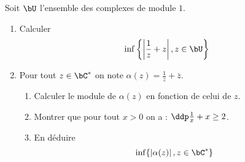 \documentclass[a4paper, 11pt,reqno]{article}
\begin{document}
\begin{exercice}
Soit $\bU$ l'ensemble des complexes de module $1$. 
\begin{enumerate}
\item Calculer 
$$\inf \left\{ \left| \frac{1}{z}+z\right| , z \in \bU\right\}$$

\item Pour tout $z\in \bC^*$ on note  $\alpha(z)= \frac{1}{{z}}+\bar{z}$. 
\begin{enumerate}
\item Calculer le module de $\alpha(z)$ en fonction de celui de $z$. 
\item Montrer que pour tout $x>0$ on a : $\ddp \frac{1}{x}+x\geq 2$.
\item En déduire 
$$\inf\{ \left| \alpha(z)\right| , z \in \bC^*\}$$
\end{enumerate}
\end{enumerate}

\end{exercice}
\end{document}
